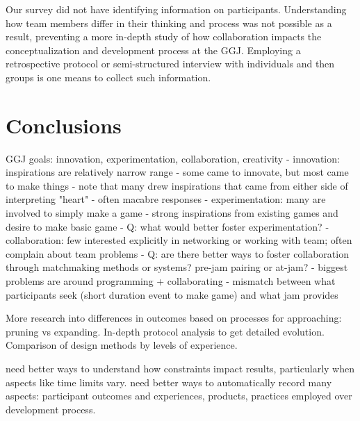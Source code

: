 \documentclass{sig-alternate}
\begin{document}
Our survey did not have identifying information on participants. Understanding how team members differ in their thinking and process was not possible as a result, preventing a more in-depth study of how collaboration impacts the conceptualization and development process at the GGJ. Employing a retrospective protocol or semi-structured interview with individuals and then groups is one means to collect such information.


\section{Conclusions}
GGJ goals: innovation, experimentation, collaboration, creativity
- innovation: inspirations are relatively narrow range
	- some came to innovate, but most came to make things
	- note that many drew inspirations that came from either side of interpreting "heart" - often macabre responses
- experimentation: many are involved to simply make a game
	- strong inspirations from existing games and desire to make basic game
	- Q: what would better foster experimentation?
- collaboration: few interested explicitly in networking or working with team; often complain about team problems
	- Q: are there better ways to foster collaboration through matchmaking methods or systems? pre-jam pairing or at-jam?
- biggest problems are around programming + collaborating
	- mismatch between what participants seek (short duration event to make game) and what jam provides

More research into differences in outcomes based on processes for approaching: pruning vs expanding. In-depth protocol analysis to get detailed evolution. Comparison of design methods by levels of experience.

need better ways to understand how constraints impact results, particularly when aspects like time limits vary. need better ways to automatically record many aspects: participant outcomes and experiences, products, practices employed over development process.





\end{document}
